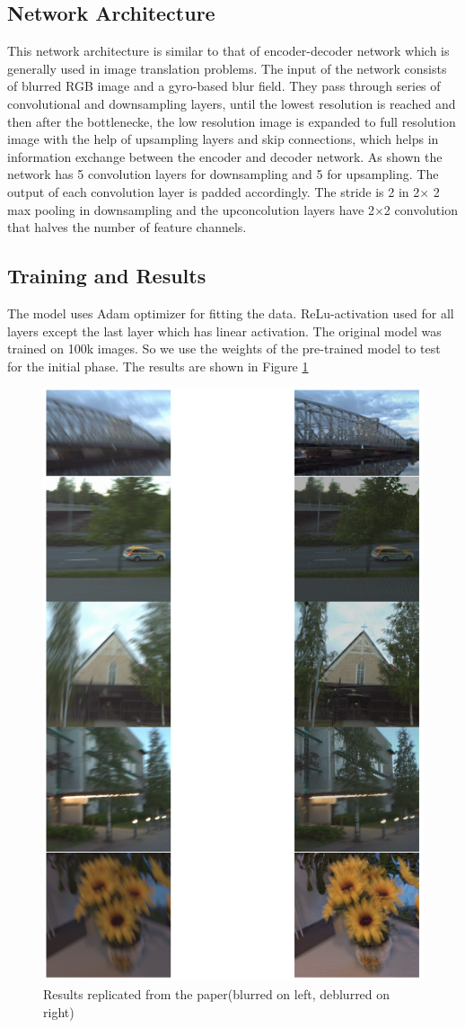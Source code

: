 \documentclass[10pt,twocolumn,letterpaper]{article}
\begin{document}
\subsection{Network Architecture}
This network architecture is similar to that of encoder-decoder network which is generally used in image translation problems. The input of the network consists of blurred RGB image and a gyro-based blur field. They pass through series of convolutional and downsampling layers, until the lowest resolution is reached and then after the bottlenecke, the low resolution image is expanded to full resolution image with the help of upsampling layers and skip connections, which helps in information exchange between the encoder and decoder network.
As shown the network has 5 convolution layers for downsampling and 5 for upsampling. The output of each convolution layer is padded accordingly. The stride is 2 in 2$\times$ 2 max pooling in downsampling and the upconcolution layers have 2$\times$2 convolution that halves the number of feature channels. 
\subsection{Training and Results}
The model uses Adam optimizer for fitting the data. ReLu-activation used for all layers except the last layer which has linear activation.  The original model was trained on 100k images. So we use the weights of the pre-trained model to test for the initial phase. The results are shown in Figure \ref{fig: ExampleBlurField}

\begin{figure}
\includegraphics[width=.5\textwidth]{images/rrp.png}
\caption{Results replicated from the paper(blurred on left, deblurred on right)}
\label{fig: ExampleBlurField}
\end{figure}
\end{document}
